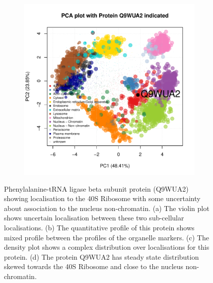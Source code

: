 \documentclass[12pt,english]{article}
\begin{document}
\begin{figure}[h]
\begin{subfigure}[t]{0.5\textwidth}
    \caption{}
  \end{subfigure}%
  \begin{subfigure}[t]{0.5\textwidth}
    \centering
\includegraphics{tagm-022}
    \caption{}
  \end{subfigure}

\caption{Phenylalanine-tRNA ligase
beta subunit protein (Q9WUA2) showing localisation to the
  40S Ribosome with some uncertainty about association to the nucleus non-chromatin.
  (a) The violin plot shows
    uncertain localisation between these two sub-cellular
    localisations. (b) The
    quantitative profile of this protein shows mixed profile between the
    profiles of the organelle markers. (c) The density plot shows a
    complex distribution over localisations for this protein. (d) The protein Q9WUA2 has steady state
    distribution skewed towards the 40S Ribosome and close to the nucleus non-chromatin.}
  \label{fig:Q9WUA2}
\end{figure}
\end{document}
